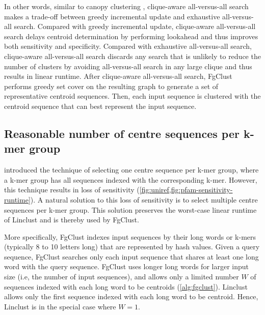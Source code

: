 \documentclass{bioinfo}
\begin{document}
\begin{methods}
In other words, similar to canopy clustering \citep{mccallum2000efficient}, clique-aware all-versus-all search makes a trade-off between greedy incremental update and exhaustive all-versus-all search. 
Compared with greedy incremental update, clique-aware all-versus-all search delays centroid determination by performing lookahead and thus improves both sensitivity and specificity.
Compared with exhaustive all-versus-all search, clique-aware all-versus-all search discards any search that is unlikely to reduce the number of clusters by avoiding all-versus-all search in any large clique and thus results in linear runtime.
After clique-aware all-versus-all search, FgClust performs greedy set cover on the resulting graph to generate a set of representative centroid sequences.
Then, each input sequence is clustered with the centroid sequence that can best represent the input sequence.


\subsection{Reasonable number of centre sequences per k-mer group}
\label{subsec:linclust-like}

 introduced the technique of selecting one centre sequence per k-mer group, where a k-mer group has all sequences indexed with the corresponding k-mer. However, this technique results in loss of sensitivity (\cref{fig:uniref,fig:pfam-sensitivity-runtime}). A natural solution to this loss of sensitivity is to select multiple centre sequences per k-mer group. This solution preserves the worst-case linear runtime of Linclust and is thereby used by FgClust.

More specifically, FgClust indexes input sequences by their long words or k-mers (typically 8 to 10 letters long) that are represented by hash values.
%
Given a query sequence, FgClust searches only each input sequence that shares at least one long word with the query sequence. 
FgClust uses longer long words for larger input size (i.e, the number of input sequences), and allows only a limited number \(W\) of sequences indexed with each long word to be centroids (\cref{alg:fgclust}).
Linclust allows only the first sequence indexed with each long word to be centroid.
Hence, Linclust is in the special case where \(W=1\).


\end{methods}
\end{document}
